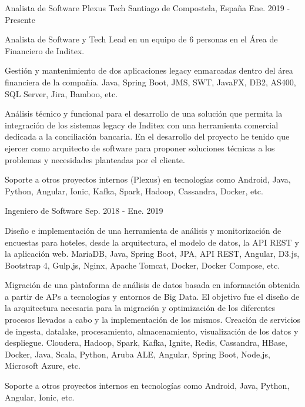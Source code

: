 
\begin{cventries}
  \cventry
    {Analista de Software}
    {Plexus Tech}
    {Santiago de Compostela, España}
    {Ene. 2019 - Presente}
    {
      \begin{cvitems}
        \item {Analista de Software y Tech Lead en un equipo de 6 personas en el Área de Financiero de Inditex.}
        \item {Gestión y mantenimiento de dos aplicaciones legacy enmarcadas dentro del área financiera de la compañía. Java, Spring Boot, JMS, SWT, JavaFX, DB2, AS400, SQL Server, Jira, Bamboo, etc.}
        \item {Análisis técnico y funcional para el desarrollo de una solución que permita la integración de los sistemas legacy de Inditex con una herramienta comercial dedicada a la conciliación bancaria. En el desarrollo del proyecto he tenido que ejercer como arquitecto de software para proponer soluciones técnicas a los problemas y necesidades planteadas por el cliente.}
        \item {Soporte a otros proyectos internos (Plexus) en tecnologías como Android, Java, Python, Angular, Ionic, Kafka, Spark, Hadoop, Cassandra, Docker, etc.}
      \end{cvitems}
    }

  \cventry
    {Ingeniero de Software}
    {}
    {}
    {Sep. 2018 - Ene. 2019}
    {
      \begin{cvitems}
        \item {Diseño e implementación de una herramienta de análisis y monitorización de encuestas para hoteles, desde la arquitectura, el modelo de datos, la API REST y la aplicación web. MariaDB, Java, Spring Boot, JPA, API REST, Angular, D3.js, Bootstrap 4, Gulp.js, Nginx, Apache Tomcat, Docker, Docker Compose, etc.}
        \item {Migración de una plataforma de análisis de datos basada en información obtenida a partir de APs a tecnologías y entornos de Big Data. El objetivo fue el diseño de la arquitectura necesaria para la migración y optimización de los diferentes procesos llevados a cabo y la implementación de los mismos. Creación de servicios de ingesta, datalake, procesamiento, almacenamiento, visualización de los datos y despliegue. Cloudera, Hadoop, Spark, Kafka, Ignite, Redis, Cassandra, HBase, Docker, Java, Scala, Python, Aruba ALE, Angular, Spring Boot, Node.js, Microsoft Azure, etc.}
        \item {Soporte a otros proyectos internos en tecnologías como Android, Java, Python, Angular, Ionic, etc.}
      \end{cvitems}
    }


\end{cventries}
